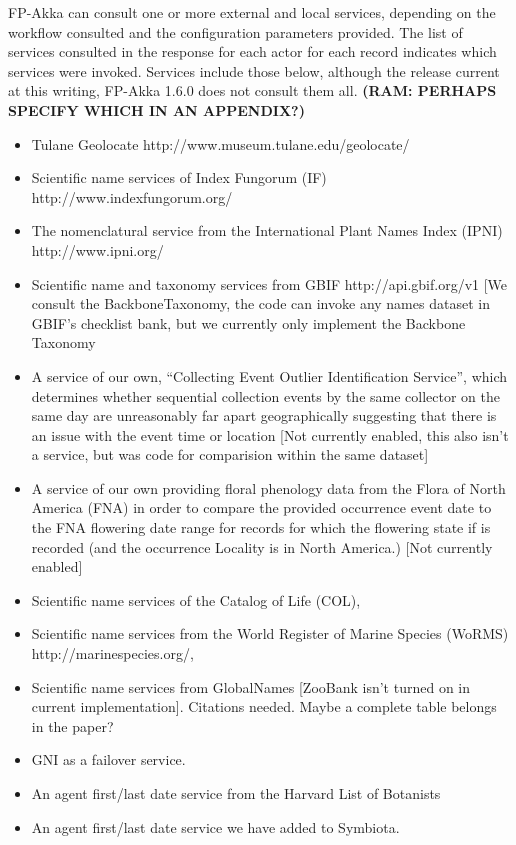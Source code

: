 \documentclass{article}
\begin{document}
 FP-Akka can consult one or more external and local services, depending on the workflow consulted and the configuration parameters provided. The list of services consulted in the response for each actor for each record indicates which services were invoked. Services include those below, although the release current at this writing, FP-Akka 1.6.0 \citep{FPA_160} does not consult them all. \textbf{(RAM: PERHAPS SPECIFY WHICH IN AN APPENDIX?)}
\begin{itemize}
  \item Tulane Geolocate http://www.museum.tulane.edu/geolocate/
  \item Scientific name services of Index Fungorum (IF) http://www.indexfungorum.org/
  \item The nomenclatural service from the International Plant Names Index (IPNI) http://www.ipni.org/
  \item Scientific name and taxonomy services from GBIF http://api.gbif.org/v1  [We consult the BackboneTaxonomy, the code can invoke any names dataset in GBIF's checklist bank, but we currently only implement the Backbone Taxonomy
  \item A service of our own, ``Collecting Event Outlier Identification Service'', which determines whether sequential collection events by the same collector on the same day are  unreasonably far apart geographically suggesting that there is an issue with the event time or location [Not currently enabled, this also isn't a service, but was code for comparision within the same dataset]
  \item A service of our own providing floral phenology data from the Flora of North America  (FNA) \citep{fna_flora_2008} in order to compare  the provided occurrence event date to the FNA flowering date range for records for which the flowering state if is recorded (and the occurrence Locality is in North America.) [Not currently enabled]
  \item Scientific name services of the Catalog of Life (COL),
  \item Scientific name services from the World Register of Marine Species (WoRMS) http://marinespecies.org/, 
  \item Scientific name services from  GlobalNames [ZooBank isn't turned on in current implementation]. Citations needed. Maybe a complete table belongs in the paper?
  \item GNI as a failover service.
  \item An agent first/last date service from the Harvard List of Botanists 
  \item An agent first/last date service we have added to Symbiota.
\end{itemize}
\end{document}
